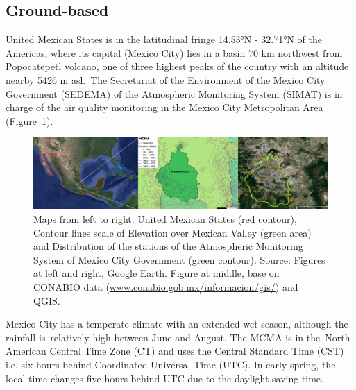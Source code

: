 \documentclass[10pt]{article}
\begin{document}
\subsection*{Ground-based~}
{\label{339070}}
United Mexican States is in the latitudinal fringe 14.53°N - 32.71°N of
the Americas, where its capital (Mexico City) lies in a basin 70 km
northwest from Popocatepetl volcano, one of three highest peaks of the
country with an altitude nearby 5426 m asl.~The Secretariat of the
Environment of the Mexico City Government (SEDEMA) of the Atmospheric
Monitoring System (SIMAT) is in charge of the air quality monitoring in
the Mexico City Metropolitan Area
(Figure~{\ref{547698}}).~~
\begin{figure}[H]
\begin{center}
\includegraphics[width=0.84\columnwidth]{figures/cdmx12mx(maps)4}
\caption{{Maps from left to right: United Mexican States (red contour), Contour
lines scale of Elevation over Mexican Valley (green area) and
Distribution of the stations of the Atmospheric Monitoring System of
Mexico City Government (green contour). Source: Figures at left and
right, Google Earth. Figure at middle, base on CONABIO data
(\href{http://www.conabio.gob.mx/informacion/gis/}{www.conabio.gob.mx/informacion/gis/})
and QGIS.
{\label{547698}}%
}}
\end{center}
\end{figure}

Mexico City has a temperate climate with an extended wet season,
although the rainfall is~relatively high between June and August. The
MCMA is in the~North American Central Time Zone (CT) and uses the
Central Standard Time (CST) i.e. six hours behind Coordinated Universal
Time (UTC). In early spring, the local time changes five hours behind
UTC due to the daylight saving time.
\end{document}
